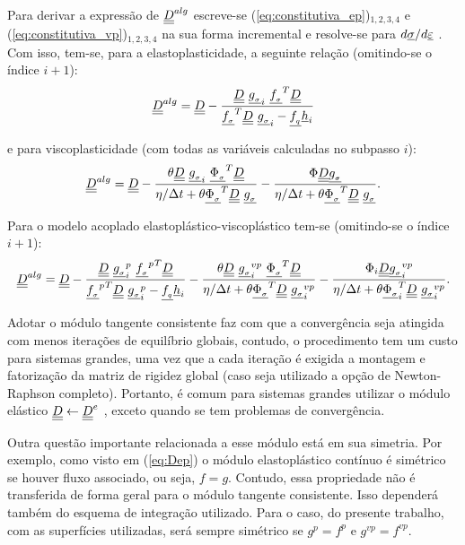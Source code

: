 Para derivar a expressão de $\underline{\underline D}^{alg}$  escreve-se (\ref{eq:constitutiva_ep})$_{1,2,3,4}$ e (\ref{eq:constitutiva_vp})$_{1,2,3,4}$ na sua forma incremental e resolve-se para $d\underline \sigma/d\underline{\varepsilon}$  \cite[p. 285]{Belytschko2000}. Com isso, tem-se, para a elastoplasticidade, a seguinte relação (omitindo-se o índice $i+1$):
\begin{equation}
	\label{eq:D_alg_ep}
	\underline{\underline D}^{alg} = \underline{\underline D} - \dfrac{\underline{\underline D}~\underline{g_{_\sigma}}_i~\underline{f_{_\sigma}}^T \underline{\underline D}}{\underline{f_{_\sigma}}^T\underline{\underline D}~\underline{g_{_\sigma}}_i-\underline{f_{_q}} \underline h_i}
\end{equation}

e para viscoplasticidade (com todas as variáveis calculadas no subpasso $i$):
\begin{equation}
	\label{eq:D_alg_vp}
	\underline{\underline D}^{alg} = \underline{\underline D} - \dfrac{\theta \underline{\underline D}~\underline{g_{_\sigma}}_i~\underline{\Phi_{_\sigma}}^T \underline{\underline D}}{\eta/\Delta t+ \theta\underline{\Phi_{_\sigma}}^T\underline{\underline D}~\underline{g_{_\sigma}}} - \dfrac{\Phi \underline{\underline D} \underline{g_{_\sigma}}}{\eta/\Delta t+ \theta \underline{\Phi_{_\sigma}}^T\underline{\underline D}~\underline{g_{_\sigma}}}.
\end{equation}

Para o modelo acoplado elastoplástico-viscoplástico tem-se (omitindo-se o índice $i+1$):
\begin{equation}
	\label{eq:D_alg_epvp}
	\underline{\underline D}^{alg} = \underline{\underline D} - \dfrac{\underline{\underline D}~\underline{g_{_\sigma}}_i^p~{\underline{f_{_\sigma}}^p}^T \underline{\underline D}}{{\underline{f_{_\sigma}}^p}^T\underline{\underline D}~\underline{g_{_\sigma}}_i^p-\underline{f_{_q}} \underline h_i} - \dfrac{\theta \underline{\underline D}~\underline{g_{_\sigma}}_i^{vp}~\underline{\Phi_{_\sigma}}^T \underline{\underline D}}{\eta/\Delta t+ \theta\underline{\Phi_{_\sigma}}^T\underline{\underline D}~\underline{g_{_\sigma}}_i^{vp}} - \dfrac{\Phi_i \underline{\underline D} \underline{g_{_\sigma}}_i^{vp}}{\eta/\Delta t+ \theta \underline{\Phi_{_\sigma}}_i^T\underline{\underline D}~\underline{g_{_\sigma}}_i^{vp}}.
\end{equation}

Adotar o módulo tangente consistente faz com que a convergência seja atingida com menos iterações de equilíbrio globais, contudo, o procedimento tem um custo para sistemas grandes, uma vez que a cada iteração é exigida a montagem e fatorização da matriz de rigidez global (caso seja utilizado a opção de Newton-Raphson completo). Portanto, é comum para sistemas grandes utilizar o módulo elástico $\underline{\underline D} \leftarrow \underline{\underline D}^e$ , exceto quando se tem problemas de convergência.

Outra questão importante relacionada a esse módulo está em sua simetria. Por exemplo, como visto em (\ref{eq:Dep}) o módulo elastoplástico contínuo é simétrico se houver fluxo associado, ou seja, $f=g$. Contudo, essa propriedade não é transferida de forma geral para o módulo tangente consistente. Isso dependerá também do esquema de integração utilizado. Para o caso, do presente trabalho, com as superfícies utilizadas, será sempre simétrico se $g^{p}=f^{p}$ e $g^{vp}=f^{vp}$.

